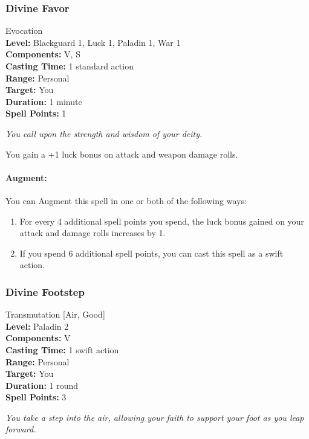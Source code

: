 \subsubsection{Divine Favor}
\label{Spell:DivineFavor}
Evocation
\\ \textbf{Level:} Blackguard 1, Luck 1, Paladin 1, War 1
\\ \textbf{Components:} V, S
\\ \textbf{Casting Time:} 1 standard action
\\ \textbf{Range:} Personal
\\ \textbf{Target:} You
\\ \textbf{Duration:} 1 minute
\\ \textbf{Spell Points:} 1

\emph{You call upon the strength and wisdom of your deity.}

You gain a +1 luck bonus on attack and weapon damage rolls.%

\paragraph{Augment:} You can Augment this spell in one or both of the following ways:
\begin{enumerate}
 \item For every 4 additional spell points you spend, the luck bonus gained on your attack and damage rolls increases by 1.
 \item If you spend 6 additional spell points, you can cast this spell as a swift action.
\end{enumerate}
\subsubsection{Divine Footstep}
\label{Spell:DivineFootstep}
Transmutation [Air, Good]
\\ \textbf{Level:} Paladin 2
\\ \textbf{Components:} V
\\ \textbf{Casting Time:} 1 swift action
\\ \textbf{Range:} Personal
\\ \textbf{Target:} You
\\ \textbf{Duration:} 1 round
\\ \textbf{Spell Points:} 3

\emph{You take a step into the air, allowing your faith to support your foot as you leap forward.}

